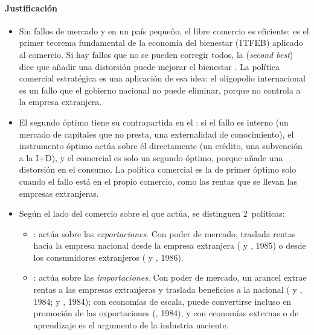 \documentclass[11pt]{article}
\begin{document}
\paragraph{Justificación}

\begin{itemize}
\item Sin fallos de mercado y en un país pequeño, el libre comercio es eficiente: es el primer teorema fundamental de la economía del bienestar (1TFEB) aplicado al comercio. Si hay fallos que no se pueden corregir todos, la  (\emph{second best})\nocite{LipseyLancaster1956General} dice que añadir una distorsión puede mejorar el bienestar . La política comercial estratégica es una aplicación de esa idea: el oligopolio internacional es un fallo que el gobierno nacional no puede eliminar, porque no controla a la empresa extranjera.
\item El segundo óptimo tiene su contrapartida en el \nocite{BhagwatiRamaswami1963Domestic}: si el fallo es interno (un mercado de capitales que no presta, una externalidad de conocimiento), el instrumento óptimo actúa sobre él directamente (un crédito, una subvención a la I+D), y el comercial es solo un segundo óptimo, porque añade una distorsión en el consumo. La política comercial es la de primer óptimo solo cuando el fallo está en el propio comercio, como las rentas que se llevan las empresas extranjeras.
\item Según el lado del comercio sobre el que actúa, se distinguen 2~políticas:
  \begin{itemize}
  \item {}: actúa sobre las \emph{exportaciones}. Con poder de mercado, traslada rentas hacia la empresa nacional desde la empresa extranjera ( y , 1985) o desde los consumidores extranjeros ( y , 1986).
  \item {}: actúa sobre las \emph{importaciones}. Con poder de mercado, un arancel extrae rentas a las empresas extranjeras y traslada beneficios a la nacional ( y , 1984;  y , 1984); con economías de escala, puede convertirse incluso en promoción de las exportaciones (, 1984), y con economías externas o de aprendizaje es el argumento de la industria naciente.
  \end{itemize}
\end{itemize}
\end{document}
